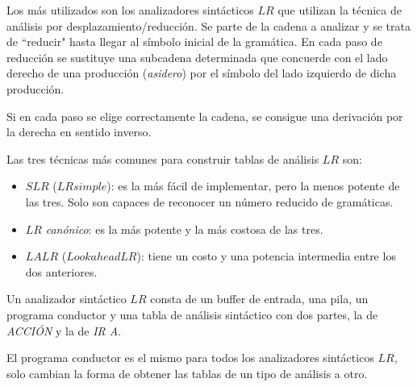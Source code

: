 Los más utilizados son los  analizadores sintácticos $LR$ que utilizan la técnica de análisis por desplazamiento/reducción. Se parte de la cadena a analizar y se trata de ``reducir"  hasta llegar al símbolo inicial de la gramática.
En cada paso de reducción se sustituye una subcadena determinada que concuerde con el lado derecho de una producción (\textit{asidero}) por el símbolo del lado izquierdo de dicha producción.

Si en cada paso se elige correctamente la cadena, se consigue una derivación por la derecha en sentido inverso.


Las tres técnicas más comunes para construir tablas de análisis $LR$ son:
\begin{itemize}

\item $SLR$ ($LR simple$): es la más fácil de implementar, pero la menos potente de las tres. Solo son capaces de reconocer un número reducido de gramáticas.

\item $LR$ \textit{canónico}: es la más potente y la más costosa de las tres.

\item $LALR$ ($Lookahead LR$): tiene un costo y una potencia intermedia entre los dos anteriores.

\end{itemize}



Un analizador sintáctico $LR$  consta de un buffer de  entrada, una pila, un programa conductor y una tabla de análisis sintáctico con dos partes, la de \textit{ACCIÓN} y la de \textit{IR A}. 

El programa conductor es el mismo para todos los analizadores sintácticos $LR$, solo cambian la forma de obtener las tablas de un tipo de análisis a otro.

